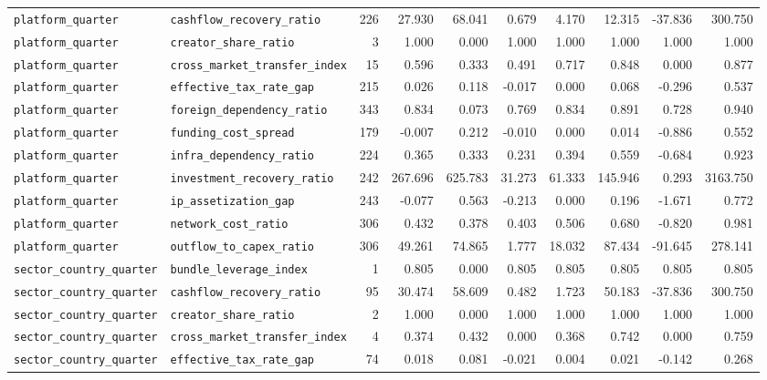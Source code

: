 \documentclass[11pt,a4paper]{report}
\begin{document}
\begin{landscape}
\begin{longtable}{@{}llrrrrrrrr@{}}
\texttt{platform\_quarter} & \texttt{cashflow\_recovery\_ratio} & 226 & 27.930 & 68.041 & 0.679 & 4.170 & 12.315 & -37.836 & 300.750 \\
\texttt{platform\_quarter} & \texttt{creator\_share\_ratio} & 3 & 1.000 & 0.000 & 1.000 & 1.000 & 1.000 & 1.000 & 1.000 \\
\texttt{platform\_quarter} & \nolinkurl{cross_market_transfer_index} & 15 & 0.596 & 0.333 & 0.491 & 0.717 & 0.848 & 0.000 & 0.877 \\
\texttt{platform\_quarter} & \texttt{effective\_tax\_rate\_gap} & 215 & 0.026 & 0.118 & -0.017 & 0.000 & 0.068 & -0.296 & 0.537 \\
\texttt{platform\_quarter} & \texttt{foreign\_dependency\_ratio} & 343 & 0.834 & 0.073 & 0.769 & 0.834 & 0.891 & 0.728 & 0.940 \\
\texttt{platform\_quarter} & \texttt{funding\_cost\_spread} & 179 & -0.007 & 0.212 & -0.010 & 0.000 & 0.014 & -0.886 & 0.552 \\
\texttt{platform\_quarter} & \texttt{infra\_dependency\_ratio} & 224 & 0.365 & 0.333 & 0.231 & 0.394 & 0.559 & -0.684 & 0.923 \\
\texttt{platform\_quarter} & \texttt{investment\_recovery\_ratio} & 242 & 267.696 & 625.783 & 31.273 & 61.333 & 145.946 & 0.293 & 3163.750 \\
\texttt{platform\_quarter} & \texttt{ip\_assetization\_gap} & 243 & -0.077 & 0.563 & -0.213 & 0.000 & 0.196 & -1.671 & 0.772 \\
\texttt{platform\_quarter} & \texttt{network\_cost\_ratio} & 306 & 0.432 & 0.378 & 0.403 & 0.506 & 0.680 & -0.820 & 0.981 \\
\texttt{platform\_quarter} & \texttt{outflow\_to\_capex\_ratio} & 306 & 49.261 & 74.865 & 1.777 & 18.032 & 87.434 & -91.645 & 278.141 \\
\texttt{sector\_country\_quarter} & \texttt{bundle\_leverage\_index} & 1 & 0.805 & 0.000 & 0.805 & 0.805 & 0.805 & 0.805 & 0.805 \\
\texttt{sector\_country\_quarter} & \texttt{cashflow\_recovery\_ratio} & 95 & 30.474 & 58.609 & 0.482 & 1.723 & 50.183 & -37.836 & 300.750 \\
\texttt{sector\_country\_quarter} & \texttt{creator\_share\_ratio} & 2 & 1.000 & 0.000 & 1.000 & 1.000 & 1.000 & 1.000 & 1.000 \\
\texttt{sector\_country\_quarter} & \nolinkurl{cross_market_transfer_index} & 4 & 0.374 & 0.432 & 0.000 & 0.368 & 0.742 & 0.000 & 0.759 \\
\texttt{sector\_country\_quarter} & \texttt{effective\_tax\_rate\_gap} & 74 & 0.018 & 0.081 & -0.021 & 0.004 & 0.021 & -0.142 & 0.268 \\

\end{longtable}
\end{landscape}
\end{document}
